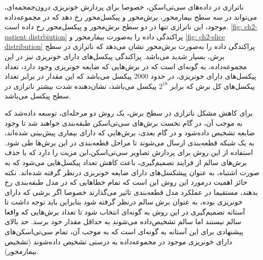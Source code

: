 ناترازی در داده‌های سی‌تی‌اسکن، خصوصا برای پردازش خونریزی درون‌جمجمه‌ای، می‌تواند در سه سطح بیمار‌محور، برش‌محور و پیکسل‌محور رخ دهد که در مجموعه‌داده موجود،‌ این ناترازی تنها در دو سطح برش‌محور و پیکسل‌محور رخ داده است. 
\autoref{fig: ch2-patient distrbiution}
پراکندگی داده را به‌صورت بیمارمحور و 
\autoref{fig: ch2-slice distribution}
پراکندگی داده را به‌صورت برش‌محور نشان می‌دهد که ناترازی در سطح برش، بسیار شدید می‌باشد. 
پراکندگی پیکسل‌های دارای خونریزی نیز در این مجموعه‌داده، به گونه‌ای است که در برش‌هایی که ضایعه خونریزی وجود دارد، تعداد پیکسل‌های دارای خونریزی، در حدود 2000 پیکسل می‌باشد که این مقدار در برابر تعداد پیکسل‌های کل برش که برابر 
$2^{18}$
پیکسل می‌باشد،‌ نشان‌دهنده شدت بیشتر ناترازی در سطح پیکسل می‌باشد.

برای کاهش مشکل ناترازی در سطح برش، یک روش دو مرحله‌ای، توسعه داده‌شد که به موجب آن،‌ در گام نخست برش‌های سی‌تی‌اسکن طبقه‌بندی خواهند شد تا وجود ضایعه تشخیص داده‌شود و در گام بعدی،‌ برش‌هایی که دارای بیماری پیش‌بینی شده‌اند،‌ به یک شبکه قطعه‌بندی ارسال می‌شوند تا مراحل قطعه‌بندی در این برش‌ها طی شود.
استفاده از این روش برای پردازش تصاویر سی‌تی‌اسکن،‌این مزیت را دارد که با حذف برش‌های سالم از فرایند تصمیم‌گیری، باعث کاهش تعداد پیکسل‌هایی می‌شود که به صورت اشتباه،‌ به عنوان پیشکسل‌های دارای ضایعه خونریزی درنظر گرفته شده‌اند. نکته حائز اهمیت درمورد این روش این است که تمام خطاهایی که در مدل طبقه‌بندی رخ بدهند، مستقیما در عملکرد مدل قطعه‌بندی تاثیر می‌گذارند خصوصا اگر برشی که دارای خونریزی بوده، به عنوان برش سالم درنظر گرفته شود بنابراین باید توجه داشت تا آستانه تصمیم‌گیری در این روش به گونه‌ای انتخاب شود تا تعداد برش‌هایی که واقعا سالم نیستند اما سالم تشخیص‌داده می‌شوند به حداقل مقدار خود برسد. حد بالای پیشنهادی برای این آستانه به گونه‌ای است که به موجب آن، تمام سی‌تی‌اسکن‌های دارای خونریزی  موجود در مجموعه‌داده به درستی تشخیص داده‌شوند (تشخیص بیمار‌محور). 


